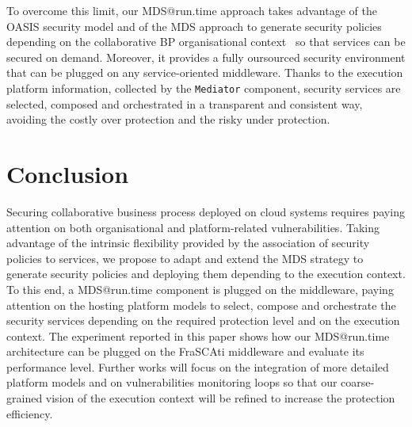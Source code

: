 \documentclass[runningheads,a4paper]{llncs}
\begin{document}
To overcome this limit, our MDS@run.time approach takes advantage of the OASIS security model and of the MDS approach to generate security policies depending on the collaborative BP organisational context~\cite{OFG13} so that services can be secured on demand. Moreover, it provides a fully oursourced security environment that can be plugged on any service-oriented middleware. Thanks to the execution platform information, collected by the \texttt{Mediator} component, security services are selected, composed and orchestrated in a transparent and consistent way, avoiding the costly over protection and the risky under protection.


\section{Conclusion}
Securing collaborative business process deployed on cloud systems requires paying attention on both organisational and platform-related vulnerabilities. Taking advantage of the intrinsic flexibility provided by the association of security policies to services, we propose to adapt and extend the MDS strategy to generate security policies and deploying them depending to the execution context. To this end, a MDS@run.time component is plugged on the middleware, paying attention on the hosting platform models to select, compose and orchestrate the security services depending on the required protection level and on the execution context.  The experiment reported in this paper shows how our MDS@run.time architecture can be plugged on the FraSCAti middleware and evaluate its performance level.
Further works will focus on the integration of more detailed platform models and on vulnerabilities monitoring loops so that our coarse-grained vision of the execution context will be refined to increase the protection efficiency.



% 
%  

\end{document}
